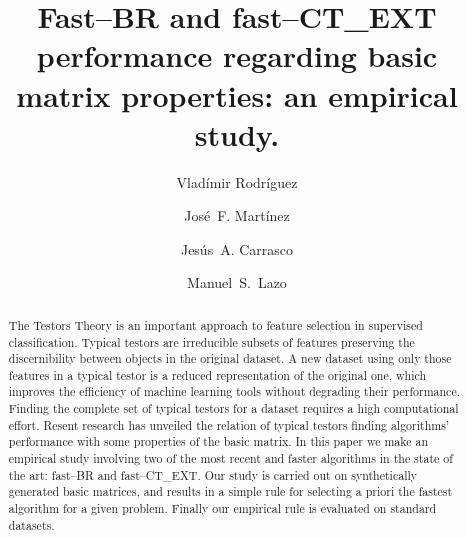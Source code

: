 \documentclass[citeauthoryear]{llncs}
\begin{document}
\mainmatter              %
%
\title{Fast--BR and fast--CT\_EXT performance regarding basic matrix properties: an empirical study.}
%
			 
\author{Vlad\'{i}mir Rodr\'{i}guez \and Jos\'{e}~F. Mart\'{i}nez
		 \and Jes\'{u}s~A. Carrasco \and Manuel~S.~Lazo}
%
%
%


\maketitle              %

\begin{abstract}
	The Testors Theory is an important approach to feature selection in supervised classification. Typical testors are irreducible subsets of features preserving the discernibility between objects in the original dataset. A new dataset using only those features in a typical testor is a reduced representation of the original one, which improves the efficiency of machine learning tools without degrading their performance. Finding the complete set of typical testors for a dataset requires a high computational effort. Resent research has unveiled the relation of typical testors finding algorithms' performance with some properties of the basic matrix. In this paper we make an empirical study involving two of the most recent and faster algorithms in the state of the art: fast--BR and fast--CT\_EXT. Our study is carried out on synthetically generated basic matrices, and results in a simple rule for selecting a priori the fastest algorithm for a given problem. Finally our empirical rule is evaluated on standard datasets.

\end{abstract}
%
\end{document}
